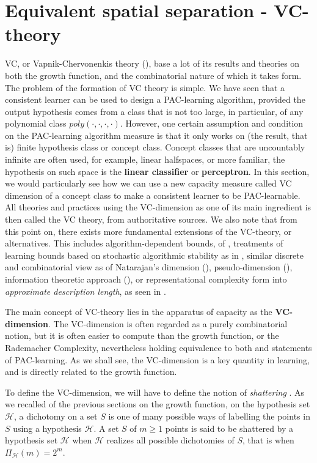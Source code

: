 \section{Equivalent spatial separation - VC-theory}

VC, or Vapnik-Chervonenkis theory (\cite{vapnik1971,Vapnik1999-VAPTNO,sauer1972,shelah1972}), base a lot of its results and theories on both the growth function, and the combinatorial nature of which it takes form. The problem of the formation of VC theory is simple. We have seen that a consistent learner can be used to design a PAC-learning algorithm, provided the output hypothesis comes from a class that is not too large, in particular, of any polynomial class $poly(\cdot,\cdot,\cdot,\cdot)$. However, one certain assumption and condition on the PAC-learning algorithm measure is that it only works on (the result, that is) finite hypothesis class or concept class. Concept classes that are uncountably infinite are often used, for example, linear halfspaces, or more familiar, the hypothesis on such space is the \textbf{linear classifier} or \textbf{perceptron}. In this section, we would particularly see how we can use a new capacity measure called VC dimension of a concept class to make a consistent learner to be PAC-learnable. All theories and practices using the VC-dimension as one of its main ingredient is then called the VC theory, from authoritative sources. We also note that from this point on, there exists more fundamental extensions of the VC-theory, or alternatives. This includes algorithm-dependent bounds, of \cite{sachs2023algorithm}, treatments of learning bounds based on stochastic algorithmic stability as in \cite{bousquet2002stability}, similar discrete and combinatorial view as of Natarajan's dimension (\cite{natarajan1989learning}), pseudo-dimension (\cite{pollard1984convergence}), information theoretic approach (\cite{xu2017information}), or representational complexity form into \textit{approximate description length}, as seen in \cite{daniely2022approximate}. 

The main concept of VC-theory lies in the apparatus of capacity as the \textbf{VC-dimension}. The VC-dimension is often regarded as a purely combinatorial notion, but it is often easier to compute than the growth function, or the Rademacher Complexity, nevertheless holding equivalence to both and statements of PAC-learning. As we shall see, the VC-dimension is a key quantity in learning, and is directly related to the growth function. 

To define the VC-dimension, we will have to define the notion of \textit{shattering} . As we recalled of the previous sections on the growth function, on the hypothesis set $\mathcal{H}$, a dichotomy on a set $S$ is one of many possible ways of labelling the points in $S$ using a hypothesis $\mathcal{H}$. A set $S$ of $m\geq 1$ points is said to be shattered by a hypothesis set $\mathcal{H}$ when $\mathcal{H}$ realizes all possible dichotomies of $S$, that is when $\Pi_{\mathcal{H}}(m)=2^{m}$. 

